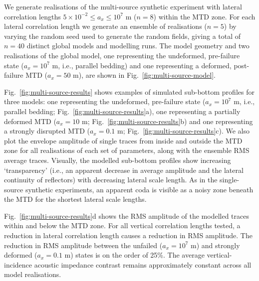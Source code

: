 \documentclass[se,manuscript]{copernicus}
\begin{document}
We generate realisations of the multi-source synthetic experiment with lateral correlation lengths $5 \times 10^{-2} \leq a_x \leq 10^7$ \unit{m} ($n=8$) within the MTD zone.
For each lateral correlation length we generate an ensemble of realisations ($n=5$) by varying the random seed used to generate the random fields, giving a total of $n=40$ distinct global models and modelling runs.
The model geometry and two realisations of the global model, one representing the undeformed, pre-failure state ($a_x={10^7}$ \unit{m}, i.e., parallel bedding) and one representing a deformed, post-failure MTD ($a_x=50$ \unit{m}), are shown in Fig.~\ref{fig:multi-source-model}.

Fig.~\ref{fig:multi-source-results} shows examples of simulated sub-bottom profiles for three models: one representing the undeformed, pre-failure state ($a_x=10^7$ \unit{m}, i.e., parallel bedding; Fig.~\ref{fig:multi-source-results}a), one representing a partially deformed MTD ($a_x=10$ \unit{m}; Fig.~\ref{fig:multi-source-results}b) and one representing a strongly disrupted MTD ($a_x=0.1$ \unit{m}; Fig.~\ref{fig:multi-source-results}c).
We also plot the envelope amplitude of single traces from inside and outside the MTD zone for all realisations of each set of parameters, along with the ensemble RMS average traces.
Visually, the modelled sub-bottom profiles show increasing `transparency' (i.e., an apparent decrease in average amplitude and the lateral continuity of reflectors) with decreasing lateral scale length.
As in the single-source synthetic experiments, an apparent coda is visible as a noisy zone beneath the MTD for the shortest lateral scale lengths.

Fig.~\ref{fig:multi-source-results}d shows the RMS amplitude of the modelled traces within and below the MTD zone.
For all vertical correlation lengths tested, a reduction in lateral correlation length causes a reduction in RMS amplitude.
The reduction in RMS amplitude between the unfailed ($a_x=10^7$ \unit{m}) and strongly deformed ($a_x=0.1$ \unit{m}) states is on the order of 25\%.
The average vertical-incidence acoustic impedance contrast remains approximately constant across all model realisations.
\end{document}
